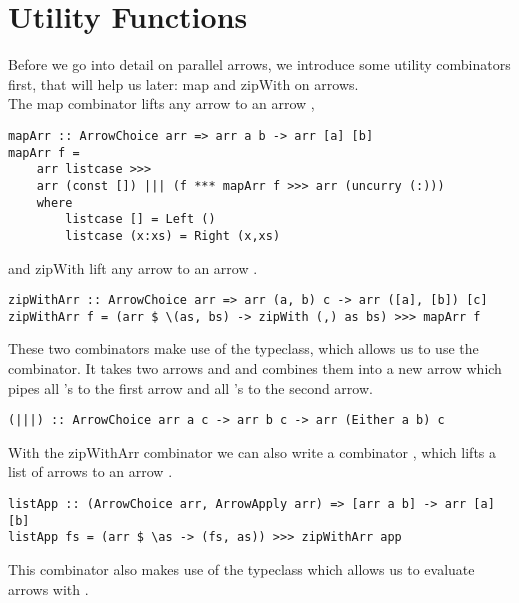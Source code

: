 \section{Utility Functions}\label{utilfns}
Before we go into detail on parallel arrows, we introduce some utility combinators first, that will help us later: map and zipWith on arrows.
\\
The map combinator lifts any arrow  to an arrow  \cite{programming_with_arrows},
\begin{lstlisting}[frame=htrbl]
mapArr :: ArrowChoice arr => arr a b -> arr [a] [b]
mapArr f =
	arr listcase >>>
	arr (const []) ||| (f *** mapArr f >>> arr (uncurry (:)))
	where
		listcase [] = Left ()
		listcase (x:xs) = Right (x,xs)
\end{lstlisting}
and zipWith lift any arrow  to an arrow .
\begin{lstlisting}[frame=htrbl]
zipWithArr :: ArrowChoice arr => arr (a, b) c -> arr ([a], [b]) [c]
zipWithArr f = (arr $ \(as, bs) -> zipWith (,) as bs) >>> mapArr f
\end{lstlisting}
These two combinators make use of the  typeclass, which allows us to use the \code{|||} combinator. It takes two arrows  and  and combines them into a new arrow  which pipes all 's to the first arrow and all 's to the second arrow.
\begin{lstlisting}[frame=htrbl]
(|||) :: ArrowChoice arr a c -> arr b c -> arr (Either a b) c
\end{lstlisting}
With the zipWithArr combinator we can also write a combinator , which lifts a list of arrows \code{[arr a b]} to an arrow .
\begin{lstlisting}[frame=htrbl]
listApp :: (ArrowChoice arr, ArrowApply arr) => [arr a b] -> arr [a] [b]
listApp fs = (arr $ \as -> (fs, as)) >>> zipWithArr app
\end{lstlisting}
This combinator also makes use of the  typeclass which allows us to evaluate arrows with .
